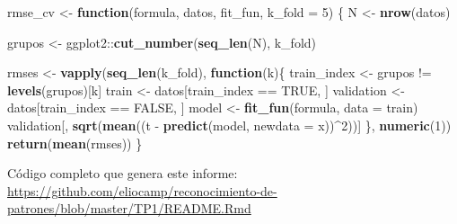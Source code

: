 \documentclass[]{tufte-handout}
\newenvironment{Shaded}{}{}
\newcommand{\ControlFlowTok}[1]{\textcolor[rgb]{0.00,0.44,0.13}{\textbf{#1}}}
\newcommand{\DataTypeTok}[1]{\textcolor[rgb]{0.56,0.13,0.00}{#1}}
\newcommand{\DecValTok}[1]{\textcolor[rgb]{0.25,0.63,0.44}{#1}}
\newcommand{\KeywordTok}[1]{\textcolor[rgb]{0.00,0.44,0.13}{\textbf{#1}}}
\newcommand{\NormalTok}[1]{#1}
\newcommand{\OperatorTok}[1]{\textcolor[rgb]{0.40,0.40,0.40}{#1}}
\newcommand{\OtherTok}[1]{\textcolor[rgb]{0.00,0.44,0.13}{#1}}
\newcommand{\StringTok}[1]{\textcolor[rgb]{0.25,0.44,0.63}{#1}}
\begin{document}
\begin{Shaded}
\begin{Highlighting}[]
\NormalTok{rmse_cv <-}\StringTok{ }\ControlFlowTok{function}\NormalTok{(formula, datos, fit_fun, }\DataTypeTok{k_fold =} \DecValTok{5}\NormalTok{) \{}
\NormalTok{  N <-}\StringTok{ }\KeywordTok{nrow}\NormalTok{(datos)}
  
\NormalTok{  grupos <-}\StringTok{ }\NormalTok{ggplot2}\OperatorTok{::}\KeywordTok{cut_number}\NormalTok{(}\KeywordTok{seq_len}\NormalTok{(N), k_fold)}
  
\NormalTok{  rmses <-}\StringTok{ }\KeywordTok{vapply}\NormalTok{(}\KeywordTok{seq_len}\NormalTok{(k_fold), }\ControlFlowTok{function}\NormalTok{(k)\{}
\NormalTok{    train_index <-}\StringTok{ }\NormalTok{grupos }\OperatorTok{!=}\StringTok{ }\KeywordTok{levels}\NormalTok{(grupos)[k] }
\NormalTok{    train <-}\StringTok{ }\NormalTok{datos[train_index }\OperatorTok{==}\StringTok{ }\OtherTok{TRUE}\NormalTok{, ]}
\NormalTok{    validation <-}\StringTok{ }\NormalTok{datos[train_index }\OperatorTok{==}\StringTok{ }\OtherTok{FALSE}\NormalTok{, ]}
\NormalTok{    model <-}\StringTok{ }\KeywordTok{fit_fun}\NormalTok{(formula, }\DataTypeTok{data =}\NormalTok{ train)}
\NormalTok{    validation[, }\KeywordTok{sqrt}\NormalTok{(}\KeywordTok{mean}\NormalTok{((t }\OperatorTok{-}\StringTok{ }\KeywordTok{predict}\NormalTok{(model, }\DataTypeTok{newdata =}\NormalTok{ x))}\OperatorTok{^}\DecValTok{2}\NormalTok{))]}
\NormalTok{  \}, }\KeywordTok{numeric}\NormalTok{(}\DecValTok{1}\NormalTok{))}
  \KeywordTok{return}\NormalTok{(}\KeywordTok{mean}\NormalTok{(rmses))}
\NormalTok{\}}
\end{Highlighting}
\end{Shaded}

Código completo que genera este informe:
\url{https://github.com/eliocamp/reconocimiento-de-patrones/blob/master/TP1/README.Rmd}
\end{document}
